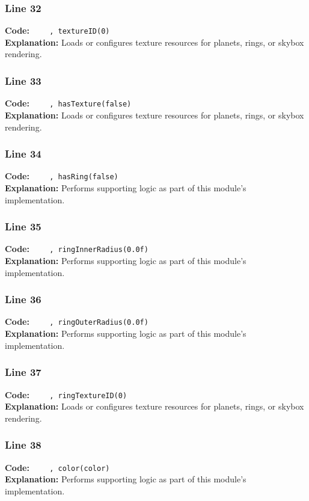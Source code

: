 \documentclass[11pt,a4paper]{article}
\begin{document}
\subsubsection*{Line 32}
\textbf{Code:} \verb|    , textureID(0)|\\
\textbf{Explanation:} Loads or configures texture resources for planets, rings, or skybox rendering.

\subsubsection*{Line 33}
\textbf{Code:} \verb|    , hasTexture(false)|\\
\textbf{Explanation:} Loads or configures texture resources for planets, rings, or skybox rendering.

\subsubsection*{Line 34}
\textbf{Code:} \verb|    , hasRing(false)|\\
\textbf{Explanation:} Performs supporting logic as part of this module's implementation.

\subsubsection*{Line 35}
\textbf{Code:} \verb|    , ringInnerRadius(0.0f)|\\
\textbf{Explanation:} Performs supporting logic as part of this module's implementation.

\subsubsection*{Line 36}
\textbf{Code:} \verb|    , ringOuterRadius(0.0f)|\\
\textbf{Explanation:} Performs supporting logic as part of this module's implementation.

\subsubsection*{Line 37}
\textbf{Code:} \verb|    , ringTextureID(0)|\\
\textbf{Explanation:} Loads or configures texture resources for planets, rings, or skybox rendering.

\subsubsection*{Line 38}
\textbf{Code:} \verb|    , color(color)|\\
\textbf{Explanation:} Performs supporting logic as part of this module's implementation.
\end{document}
